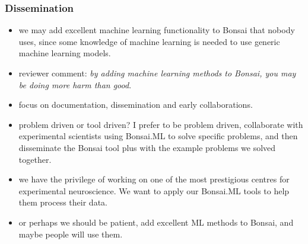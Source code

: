 
\begin{frame}
    \frametitle{Dissemination}

    \begin{itemize}[<+->]

        \item we may add excellent machine learning functionality to Bonsai
            that nobody uses, since some knowledge of machine learning is needed
            to use generic machine learning models.

        \item reviewer comment: \emph{by adding machine learning methods
            to Bonsai, you may be doing more harm than good}.

        \item focus on documentation, dissemination and early collaborations.

        \item problem driven or tool driven? I prefer to be problem driven,
            collaborate with experimental scientists using Bonsai.ML to solve
            specific problems, and then disseminate the Bonsai tool plus with
            the example problems we solved together.

        \item we have the privilege of working on one of the most prestigious
            centres for experimental neuroscience. We want to apply our
            Bonsai.ML tools to help them process their data.

        \item or perhaps we should be patient, add excellent ML methods to
            Bonsai, and maybe people will use them.

    \end{itemize}

\end{frame}

